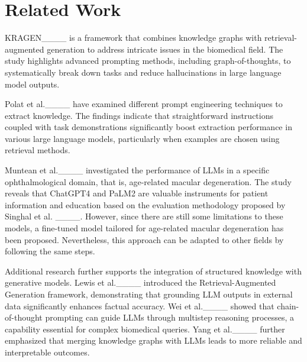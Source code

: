 \section{Related Work}
KRAGEN____ is a framework that combines knowledge graphs with retrieval-augmented generation to address intricate issues in the biomedical field. The study highlights advanced prompting methods, including graph-of-thoughts, to systematically break down tasks and reduce hallucinations in large language model outputs.

Polat et al.____ have examined different prompt engineering techniques to extract knowledge. The findings indicate that straightforward instructions coupled with task demonstrations significantly boost extraction performance in various large language models, particularly when examples are chosen using retrieval methods.

Muntean et al.____ investigated the performance of LLMs in a specific ophthalmological domain, that is, age-related macular degeneration. The study reveals that ChatGPT4 and PaLM2 are valuable instruments for patient information and education based on the evaluation methodology proposed by Singhal et al. ____. However, since there are still some limitations to these models, a fine-tuned model tailored for age-related macular degeneration has been proposed. Nevertheless, this approach can be adapted to other fields by following the same steps.

Additional research further supports the integration of structured knowledge with generative models. Lewis et al.____ introduced the Retrieval-Augmented Generation framework, demonstrating that grounding LLM outputs in external data significantly enhances factual accuracy. Wei et al.____ showed that chain-of-thought prompting can guide LLMs through multistep reasoning processes, a capability essential for complex biomedical queries. Yang et al.____ further emphasized that merging knowledge graphs with LLMs leads to more reliable and interpretable outcomes.